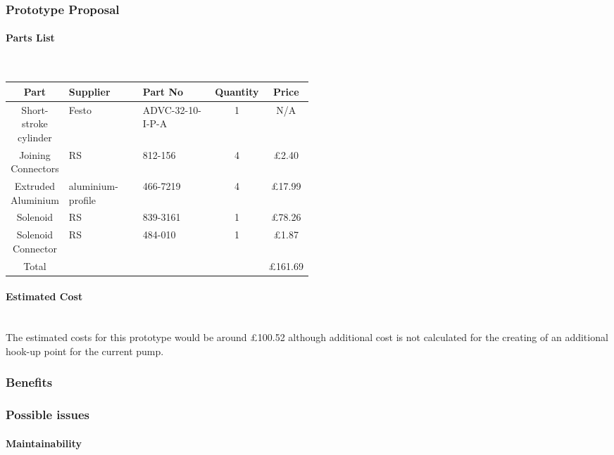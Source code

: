 \documentclass[11pt]{article}
\begin{document}
\subsubsection{Prototype Proposal}
\paragraph{Parts List}\mbox{}\\

\begin{center}
    \begin{longtable}{||c | p{0.25\linewidth}   |p{0.25\linewidth} | c | c||} 
      \hline
      Part & Supplier & Part No & Quantity & Price \\ [0.5ex] 
      \hline\hline
      Short-stroke cylinder & Festo & ADVC-32-10-I-P-A  & 1 & N/A \\ 
      \hline
      Joining Connectors & RS & 812-156 & 4 & \pounds2.40 \\
      \hline
      Extruded Aluminium & aluminium-profile &  466-7219 & 4 & \pounds17.99\\
      \hline
      Solenoid & RS &  839-3161 & 1 & \pounds78.26\\
      \hline
      Solenoid Connector & RS & 484-010 & 1 & \pounds1.87 \\ [1ex] 
      \hline
      \hline
      Total & & & & \pounds161.69\\
      \hline
    \end{longtable}
\end{center}

\paragraph{Estimated Cost}\mbox{}\\
The estimated costs for this prototype would be around \pounds100.52 although additional cost is not calculated for the creating of an additional hook-up point for the current pump.
\subsubsection{Benefits}
\subsubsection{Possible issues}
\paragraph{Maintainability}\mbox{}\\
\end{document}
